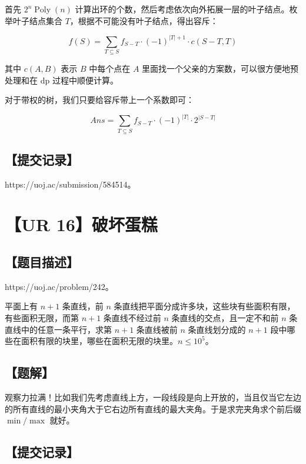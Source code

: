 \documentclass[UTF8,12pt,a4paper]{ctexart}
\begin{document}
	首先 $2^n\operatorname{Poly}(n)$ 计算出环的个数，然后考虑依次向外拓展一层的叶子结点。枚举叶子结点集合 $T$，根据不可能没有叶子结点，得出容斥：
	
	$$
	f(S)=\sum_{T\subseteq S} f_{S-T}\cdot (-1)^{|T|+1} \cdot c(S-T,T)
	$$
	
	其中 $c(A,B)$ 表示 $B$ 中每个点在 $A$ 里面找一个父亲的方案数，可以很方便地预处理和在 dp 过程中顺便计算。
	
	对于带权的树，我们只要给容斥带上一个系数即可：
	
	$$
	Ans=\sum_{T\subseteq S} f_{S-T}\cdot (-1)^{|T|}\cdot 2^{|S-T|}
	$$
	
	\subsection*{【提交记录】}
	
	https://uoj.ac/submission/584514。
	
	
	\section*{【UR 16】破坏蛋糕}
	
	\subsection*{【题目描述】}
	
	https://uoj.ac/problem/242。
	
	平面上有 $n+1$ 条直线，前 $n$ 条直线把平面分成许多块，这些块有些面积有限，有些面积无限，而第 $n+1$ 条直线不经过前 $n$ 条直线的交点，且一定不和前 $n$ 条直线中的任意一条平行，求第 $n+1$ 条直线被前 $n$ 条直线划分成的 $n+1$ 段中哪些在面积有限的块里，哪些在面积无限的块里。$n\le 10^5$。
	
	\subsection*{【题解】}
	
	观察力拉满！比如我们先考虑直线上方，一段线段是向上开放的，当且仅当它左边的所有直线的最小夹角大于它右边所有直线的最大夹角。于是求完夹角求个前后缀 $\min/\max$ 就好。
	
	\subsection*{【提交记录】}
	
\end{document}
